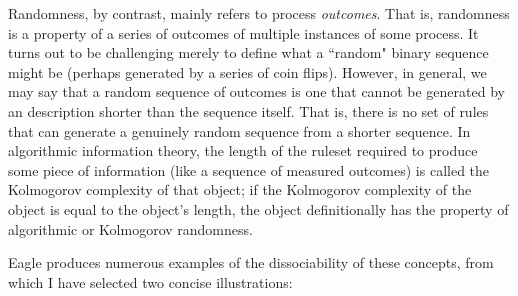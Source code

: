 Randomness, by contrast, mainly refers to process \textit{outcomes}. That is, randomness is a property of a series of outcomes of multiple instances of some process. It turns out to be challenging merely to define what a ``random" binary sequence might be (perhaps generated by a series of coin flips). However, in general, we may say that a random sequence of outcomes is one that cannot be generated by an description shorter than the sequence itself. That is, there is no set of rules that can generate a genuinely random sequence from a shorter sequence. In algorithmic information theory, the length of the ruleset required to produce some piece of information (like a sequence of measured outcomes) is called the Kolmogorov complexity of that object; if the Kolmogorov complexity of the object is equal to the object's length, the object definitionally has the property of algorithmic or Kolmogorov randomness.

Eagle produces numerous examples of the dissociability of these concepts, from which I have selected two concise illustrations:

